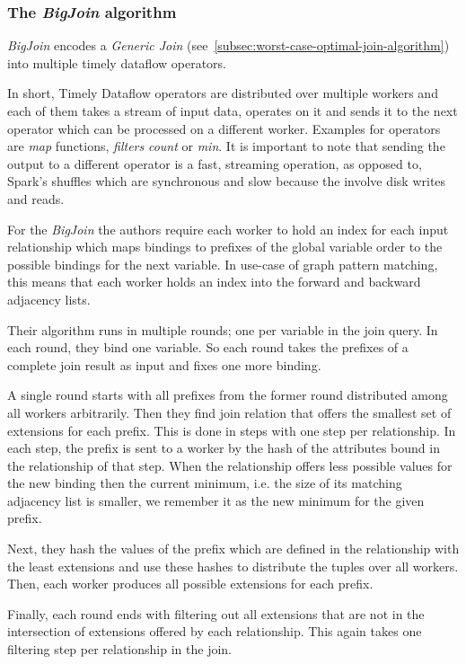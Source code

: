 \subsubsection{The \textit{BigJoin} algorithm}
\textit{BigJoin} encodes a \textit{Generic Join} (see~\cref{subsec:worst-case-optimal-join-algorithm}) into multiple
timely dataflow operators.

In short, Timely Dataflow operators are distributed over multiple workers and each of them takes a stream of input data, operates
on it and sends it to the next operator which can be processed on a different worker.
Examples for operators are \textit{map} functions, \textit{filters} \textit{count} or \textit{min}.
It is important to note that sending the output to a different operator is a fast, streaming operation, as opposed to,
Spark's shuffles which are synchronous and slow because the involve disk writes and reads.

For the \textit{BigJoin} the authors require each worker to hold an index for each input relationship which maps bindings to prefixes
of the global variable order to the possible bindings for the next variable.
In use-case of graph pattern matching, this means that each worker holds an index into the forward and backward adjacency lists.

Their algorithm runs in multiple rounds;
one per variable in the join query.
In each round, they bind one variable.
So each round takes the prefixes of a complete join result as input and fixes one more binding.

A single round starts with all prefixes from the former round distributed among all workers arbitrarily.
Then they find join relation that offers the smallest set of extensions for each prefix.
This is done in steps with one step per relationship.
In each step, the prefix is sent to a worker by the hash of the attributes bound in the relationship of that step.
When the relationship offers less possible values for the new binding then the current minimum, i.e. the size of its matching adjacency
list is smaller, we remember it as the new minimum for the given prefix.

Next, they hash the values of the prefix which are defined in the relationship with the least extensions and use these hashes to
distribute the tuples over all workers.
Then, each worker produces all possible extensions for each prefix.

Finally, each round ends with filtering out all extensions that are not in the intersection of extensions offered by each relationship.
This again takes one filtering step per relationship in the join.

